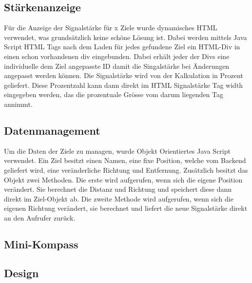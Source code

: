 \subsection{Stärkenanzeige} %
\label{sub:stärkenanzeige}
Für die Anzeige der Signalstärke für x Ziele wurde dynamisches HTML verwendet, was grundsätzlich keine schöne Lösung ist. Dabei werden mittels Java Script HTML Tags nach dem Laden für jedes gefundene Ziel ein HTML-Div in einen schon vorhandenen div eingebunden. Dabei erhält jeder der Divs eine individuelle dem Ziel angepasste ID damit die Singalstärke bei Änderungen angepasst werden können. Die Signalstärke wird von der Kalkulation in Prozent geliefert. Diese Prozentzahl kann dann direkt im HTML Signalstärke Tag width eingegeben werden, das die prozentuale Grösse vom darum liegenden Tag annimmt.

\subsection{Datenmanagement} %
\label{sub:datenmanagement}
Um die Daten der Ziele zu managen, wurde Objekt Orientiertes Java Script verwendet. Ein Ziel besitzt einen Namen, eine fixe Position, welche vom Backend geliefert wird, eine veränderliche Richtung und Entfernung. Zusätzlich besitzt das Objekt zwei Methoden. Die erste wird aufgerufen, wenn sich die eigene Position verändert. Sie berechnet die Distanz und Richtung und speichert diese dann direkt im Ziel-Objekt ab. Die zweite Methode wird aufgerufen, wenn sich die eigenen Richtung verändert, sie berechnet und liefert die neue Signalstärke direkt an den Aufrufer zurück. 

\subsection{Mini-Kompass} %
\label{sub:mini_kompass}


\subsection{Design} %
\label{sub:design}


